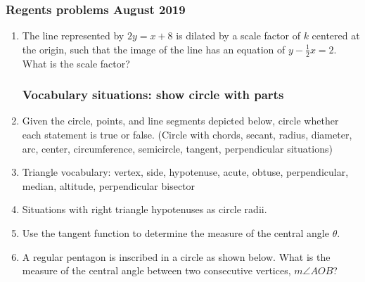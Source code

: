 \documentclass[12pt, twoside]{article}
\begin{document}
\subsubsection*{Regents problems August 2019}
  \begin{enumerate}

\subsubsection*{Sketch the situation on the axes. Mark important values. Do NOT solve!}
 
\item The line represented by $2y=x+8$ is dilated by a scale factor of $k$ centered at the origin, such that the image of the line has an equation of $\displaystyle y-\frac{1}{2}x=2$. What is the scale factor?
\begin{center}
\end{center}


\newpage   
\subsubsection*{Vocabulary situations: show circle with parts}
    
  \item Given the circle, points, and line segments depicted below, circle whether each statement is true or false.
  (Circle with chords, secant, radius, diameter, arc, center, circumference, semicircle, tangent, perpendicular situations)
  
  \item Triangle vocabulary: vertex, side, hypotenuse, acute, obtuse, perpendicular, median, altitude, perpendicular bisector
  
  \item Situations with right triangle hypotenuses as circle radii.

  \item Use the tangent function to determine the measure of the central angle $\theta$.
  
  \item A regular pentagon is inscribed in a circle as shown below. What is the measure of the central angle between two consecutive vertices, $m\angle AOB$?
  

\end{enumerate}
\end{document}
